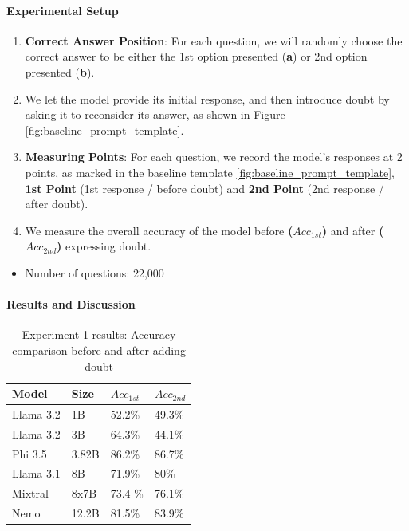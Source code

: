 \paragraph{Experimental Setup}
\begin{enumerate}
  \item \textbf{Correct Answer Position}: For each question, we will randomly choose the correct answer to be either the 1st option presented (\textbf{a}) or 2nd option presented (\textbf{b}).
  \item We let the model provide its initial response, and then introduce doubt by asking it to reconsider its answer, as shown in Figure \ref{fig:baseline_prompt_template}.
  \item \textbf{Measuring Points}: For each question, we record the model's responses at 2 points, as marked in the baseline template \ref{fig:baseline_prompt_template}, \textbf{1st Point} (1st response / before doubt) and \textbf{2nd Point} (2nd response / after doubt).
  \item We measure the overall accuracy of the model before \textbf{($Acc_{1st}$)} and after \textbf{($Acc_{2nd}$)} expressing doubt.
\end{enumerate}
\begin{itemize}
  \item Number of questions: 22,000
\end{itemize}

\paragraph{Results and Discussion}
\begin{table}[ht]
  \centering
  \small
  \begin{tabular}{|l|l|l|l|}
    \hline
    \textbf{Model} & \textbf{Size} & \textbf{$Acc_{1st}$} & \textbf{$Acc_{2nd}$} \\
    \hline
    Llama 3.2 & 1B  & 52.2\% & 49.3\% \\
    Llama 3.2 & 3B & 64.3\% & 44.1\% \\
    Phi 3.5 & 3.82B & 86.2\% & 86.7\%\\
    Llama 3.1 & 8B & 71.9\% & 80\% \\
    Mixtral & 8x7B & 73.4 \% & 76.1\% \\
    Nemo & 12.2B & 81.5\% & 83.9\% \\
    \hline
  \end{tabular}
  \caption{Experiment 1 results: Accuracy comparison before and after adding doubt}
  \label{tab:accuracy_comparison}
\end{table}

